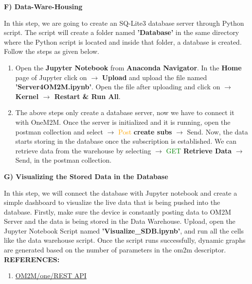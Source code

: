 \documentclass[12pt,a4paper]{article}
\begin{document}
\begin{justify}
\noindent \textbf{F) Data-Ware-Housing}

\noindent In this step, we are going to create an SQ-Lite3 database server through Python script. The script will create a folder named \textbf{'Database'} in the same directory where the Python script is located and inside that folder, a database is created. Follow the steps as given below.
\begin{enumerate}
    \item Open the \textbf{Jupyter Notebook} from \textbf{Anaconda Navigator}. In the \textbf{Home} page of Jupyter click on $ \rightarrow $ \textbf{Upload} and upload the file named \textbf{'Server4OM2M.ipynb'}. Open the file after uploading and click on \textbf{$ \rightarrow $ Kernel $ \rightarrow $ Restart \& Run All}.

\item The above steps only create a database server, now we have to connect it with OneM2M. Once the server is initialized and it is running, open the postman collection and select $ \rightarrow $ \textcolor{orange}{Post} \textbf{create subs} $ \rightarrow $ Send. Now, the data starts storing in the database once the subscription is established. We can retrieve data from the warehouse by selecting $ \rightarrow $ \textcolor{green}{GET} \textbf{Retrieve Data} $ \rightarrow $ Send, in the postman collection.
\end{enumerate}

\noindent \textbf{G) Visualizing the Stored Data in the Database}

\noindent In this step, we will connect the database with Jupyter notebook and create a simple dashboard to visualize the live data that is being pushed into the database. Firstly, make sure the device is constantly posting data to OM2M Server and the data is being stored in the Data Warehouse. Upload, open the Jupyter Notebook Script named \textbf{'Visualize\_SDB.ipynb'}, and run all the cells
like the data warehouse script. Once the script runs successfully, dynamic graphs are generated based on the number of parameters in the om2m descriptor.\\[6pt]

\noindent \textbf{\large REFERENCES:}
\vspace{-3mm}
\begin{enumerate}
\setlength\itemsep{-0.3em}
\item  \href {https://wiki.eclipse.org/OM2M/one/REST_API#Create_a_.22MY_SENSOR.22_application}{OM2M/one/REST API}
\end{enumerate}

\end{justify}
\end{document}
